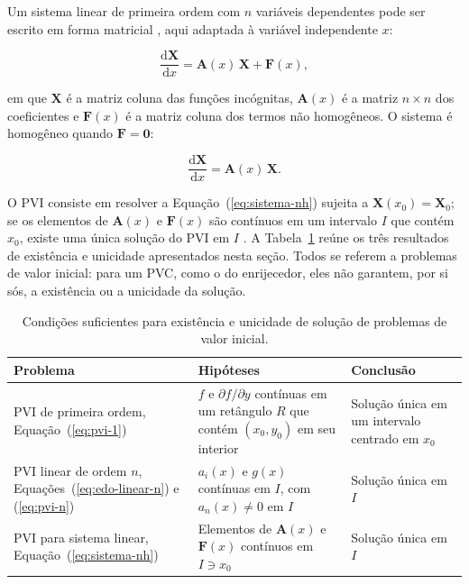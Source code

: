 \documentclass[arial,centeredequations,english,brazilian,oneside,section=TITLE]{ifes8}
\begin{document}
Um sistema linear de primeira ordem com $n$ variáveis dependentes pode ser escrito em
forma matricial \cite{Zill2001v2}, aqui adaptada à variável independente $x$:

\begin{equation}
  \label{eq:sistema-nh}
  \frac{\mathrm{d}\mathbf{X}}{\mathrm{d}x} = \mathbf{A}(x)\,\mathbf{X} + \mathbf{F}(x),
\end{equation}

em que $\mathbf{X}$ é a matriz coluna das funções incógnitas, $\mathbf{A}(x)$ é a matriz
$n \times n$ dos coeficientes e $\mathbf{F}(x)$ é a matriz coluna dos termos não
homogêneos. O sistema é homogêneo quando $\mathbf{F} = \mathbf{0}$:

\begin{equation}
  \label{eq:sistema-h}
  \frac{\mathrm{d}\mathbf{X}}{\mathrm{d}x} = \mathbf{A}(x)\,\mathbf{X}.
\end{equation}

O PVI consiste em resolver a Equação~(\ref{eq:sistema-nh}) sujeita a
$\mathbf{X}(x_0) = \mathbf{X}_0$; se os elementos de $\mathbf{A}(x)$ e $\mathbf{F}(x)$
são contínuos em um intervalo $I$ que contém $x_0$, existe uma única solução do PVI em
$I$ \cite{Zill2001v2}. A Tabela~\ref{tab:existencia-unicidade} reúne os três
resultados de existência e unicidade apresentados nesta seção. Todos se referem a
problemas de valor inicial: para um PVC, como o do enrijecedor, eles não garantem, por
si sós, a existência ou a unicidade da solução.
 
\begin{table}[h]
  \caption{Condições suficientes para existência e unicidade de solução de problemas de
    valor inicial.}
  \label{tab:existencia-unicidade}
  \begin{center}
    \begin{tabular}{p{4.2cm}p{6.2cm}p{3.6cm}}
      \toprule
      Problema & Hipóteses & Conclusão \\
      \midrule
      PVI de primeira ordem, Equação~(\ref{eq:pvi-1})
        & $f$ e $\partial f/\partial y$ contínuas em um retângulo $R$ que contém
          $(x_0, y_0)$ em seu interior
        & Solução única em um intervalo centrado em $x_0$ \\[1ex]
      PVI linear de ordem $n$, Equações~(\ref{eq:edo-linear-n}) e (\ref{eq:pvi-n})
        & $a_i(x)$ e $g(x)$ contínuas em $I$, com $a_n(x) \neq 0$ em $I$
        & Solução única em $I$ \\[1ex]
      PVI para sistema linear, Equação~(\ref{eq:sistema-nh})
        & Elementos de $\mathbf{A}(x)$ e $\mathbf{F}(x)$ contínuos em $I \ni x_0$
        & Solução única em $I$ \\
      \bottomrule
    \end{tabular}
  \end{center}
\end{table}
 
\end{document}
